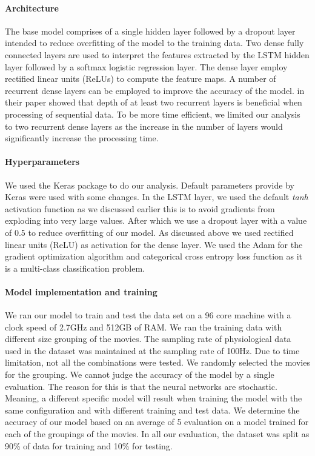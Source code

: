 \paragraph{Architecture} The base model comprises of a single hidden layer followed by a dropout layer intended to reduce overfitting of the model to the training data. Two dense fully connected layers are used to interpret the features extracted by the LSTM hidden layer followed by a softmax logistic regression layer. The dense layer employ rectified linear units (ReLUs) to compute the feature maps. A number of recurrent dense layers can be employed to improve the accuracy of the model. \citeauthor{karpathy_visualizing_2015} in their paper showed that depth of at least two recurrent layers is beneficial when processing of sequential data. To be more time efficient, we limited our analysis to two recurrent dense layers as the increase in the number of layers would significantly increase the processing time. 

\paragraph{Hyperparameters} We used the Keras \cite{keras} package to do our analysis. Default parameters provide by Keras were used with some changes. In the LSTM layer, we used the default \textit{tanh} activation function as we discussed earlier this is to avoid gradients from exploding into very large values. After which we use a dropout layer with a value of 0.5 to reduce overfitting of our model. As discussed above we used rectified linear units (ReLU) as activation for the dense layer. We used the Adam for the gradient optimization algorithm \cite{kingma_adam:_2014} and categorical cross entropy loss function as it is a multi-class classification problem. 

\paragraph{Model implementation and training} We ran our model to train and test the data set on a 96 core machine with a clock speed of 2.7GHz and 512GB of RAM. We ran the training data with different size grouping of the movies. The sampling rate of physiological data used in the dataset was maintained at the sampling rate of 100Hz. Due to time limitation, not all the combinations were tested. We randomly selected the movies for the grouping. We cannot judge the accuracy of the model by a single evaluation. The reason for this is that the neural networks are stochastic. Meaning, a different specific model will result when training the model with the same configuration and with different training and test data. We determine the accuracy of our model based on an average of 5 evaluation on a model trained for each of the groupings of the movies. In all our evaluation, the dataset was split as 90\% of data for training and 10\% for testing.

